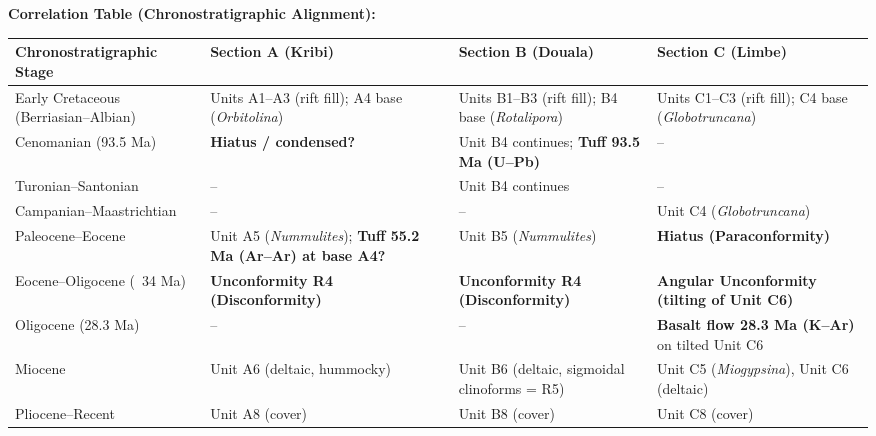 \documentclass[11pt]{article}
\begin{document}
\begin{exoresolu}
\textbf{Correlation Table (Chronostratigraphic Alignment):}
\begin{center}
\begin{tabularx}{\linewidth}{|l|X|X|X|}
\hline
\rowcolor{popblueL}
\textbf{Chronostratigraphic Stage} & \textbf{Section A (Kribi)} & \textbf{Section B (Douala)} & \textbf{Section C (Limbe)} \\
\hline
Early Cretaceous (Berriasian–Albian) & Units A1–A3 (rift fill); A4 base (\emph{Orbitolina}) & Units B1–B3 (rift fill); B4 base (\emph{Rotalipora}) & Units C1–C3 (rift fill); C4 base (\emph{Globotruncana}) \\
Cenomanian (93.5 Ma) & \textbf{Hiatus / condensed?} & Unit B4 continues; \textbf{Tuff 93.5 Ma (U–Pb)} & – \\
Turonian–Santonian & – & Unit B4 continues & – \\
Campanian–Maastrichtian & – & – & Unit C4 (\emph{Globotruncana}) \\
Paleocene–Eocene & Unit A5 (\emph{Nummulites}); \textbf{Tuff 55.2 Ma (Ar–Ar) at base A4?} & Unit B5 (\emph{Nummulites}) & \textbf{Hiatus (Paraconformity)} \\
Eocene–Oligocene (~34 Ma) & \textbf{Unconformity R4 (Disconformity)} & \textbf{Unconformity R4 (Disconformity)} & \textbf{Angular Unconformity (tilting of Unit C6)} \\
Oligocene (28.3 Ma) & – & – & \textbf{Basalt flow 28.3 Ma (K–Ar)} on tilted Unit C6 \\
Miocene & Unit A6 (deltaic, hummocky) & Unit B6 (deltaic, sigmoidal clinoforms = R5) & Unit C5 (\emph{Miogypsina}), Unit C6 (deltaic) \\
Pliocene–Recent & Unit A8 (cover) & Unit B8 (cover) & Unit C8 (cover) \\
\hline
\end{tabularx}
\end{center}


\end{exoresolu}
\end{document}
